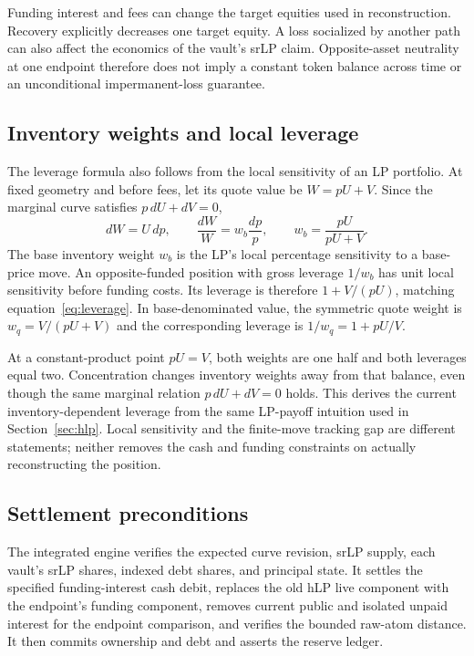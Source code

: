 Funding interest and fees can change the target equities used in reconstruction. Recovery explicitly decreases one target equity. A loss socialized by another path can also affect the economics of the vault's srLP claim. Opposite-asset neutrality at one endpoint therefore does not imply a constant token balance across time or an unconditional impermanent-loss guarantee.

\subsection{Inventory weights and local leverage}

The leverage formula also follows from the local sensitivity of an LP portfolio. At fixed geometry and before fees, let its quote value be $W=pU+V$. Since the marginal curve satisfies $p\,dU+dV=0$,
\begin{equation}
dW=U\,dp,\qquad
\frac{dW}{W}=w_b\frac{dp}{p},\qquad
w_b=\frac{pU}{pU+V}.
\end{equation}
The base inventory weight $w_b$ is the LP's local percentage sensitivity to a base-price move. An opposite-funded position with gross leverage $1/w_b$ has unit local sensitivity before funding costs. Its leverage is therefore $1+V/(pU)$, matching equation~\eqref{eq:leverage}. In base-denominated value, the symmetric quote weight is $w_q=V/(pU+V)$ and the corresponding leverage is $1/w_q=1+pU/V$.

At a constant-product point $pU=V$, both weights are one half and both leverages equal two. Concentration changes inventory weights away from that balance, even though the same marginal relation $p\,dU+dV=0$ holds. This derives the current inventory-dependent leverage from the same LP-payoff intuition used in Section~\ref{sec:hlp}. Local sensitivity and the finite-move tracking gap are different statements; neither removes the cash and funding constraints on actually reconstructing the position.

\subsection{Settlement preconditions}

The integrated engine verifies the expected curve revision, srLP supply, each vault's srLP shares, indexed debt shares, and principal state. It settles the specified funding-interest cash debit, replaces the old hLP live component with the endpoint's funding component, removes current public and isolated unpaid interest for the endpoint comparison, and verifies the bounded raw-atom distance. It then commits ownership and debt and asserts the reserve ledger.

